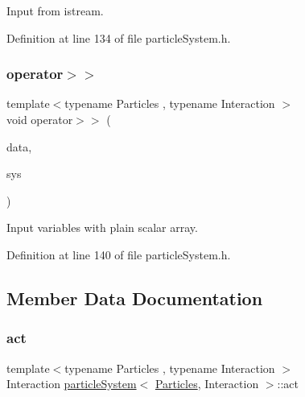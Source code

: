 Input from istream. 



Definition at line 134 of file particle\+System.\+h.

\mbox{\label{classparticle_system_a53c94eb1bfef0dfea4ab31fcd64f72a6}} 
\subsubsection{\texorpdfstring{operator$>$$>$}{operator>>}\hspace{0.1cm}{\footnotesize\ttfamily [2/2]}}
{\footnotesize\ttfamily template$<$typename Particles , typename Interaction $>$ \\
void operator$>$$>$ (\begin{DoxyParamCaption}\item[{\mbox{\hyperlink{classparticle_system_a768fe562ed8dcc0973f3d422708835bf}{Dyn\+Scalar\+Array}} \&}]{data,  }\item[{\mbox{\hyperlink{classparticle_system}{particle\+System}}$<$ \mbox{\hyperlink{struct_particles}{Particles}}, Interaction $>$ \&}]{sys }\end{DoxyParamCaption})\hspace{0.3cm}{\ttfamily [friend]}}



Input variables with plain scalar array. 



Definition at line 140 of file particle\+System.\+h.



\subsection{Member Data Documentation}
\mbox{\label{classparticle_system_a41e5c73bc46164302db25b5c5d28aedd}} 
\subsubsection{\texorpdfstring{act}{act}}
{\footnotesize\ttfamily template$<$typename Particles , typename Interaction $>$ \\
Interaction \mbox{\hyperlink{classparticle_system}{particle\+System}}$<$ \mbox{\hyperlink{struct_particles}{Particles}}, Interaction $>$\+::act\hspace{0.3cm}{\ttfamily [protected]}}



